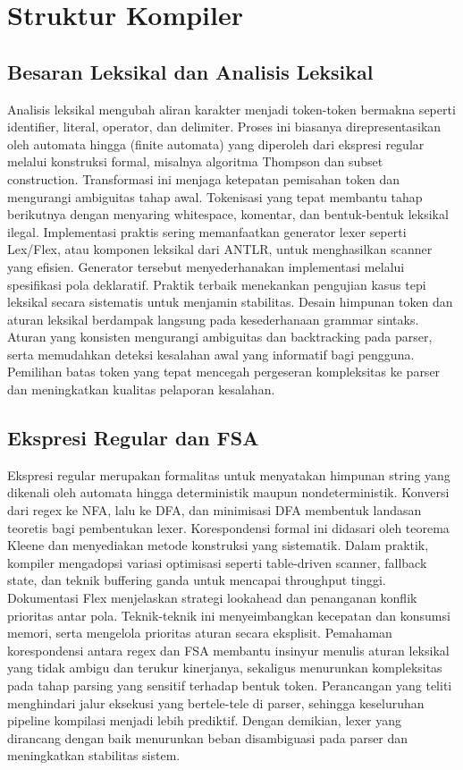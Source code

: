 \documentclass[../main.tex]{subfiles}
\begin{document}
\chapter{Struktur Kompiler}
\label{ch:struktur-kompiler}

\section{Besaran Leksikal dan Analisis Leksikal}
Analisis leksikal mengubah aliran karakter menjadi token-token bermakna seperti identifier, literal, operator, dan delimiter. Proses ini biasanya direpresentasikan oleh automata hingga (finite automata) yang diperoleh dari ekspresi regular melalui konstruksi formal, misalnya algoritma Thompson dan subset construction.\cite{aho-dragon-book-2006, hopcroft-ullman} Transformasi ini menjaga ketepatan pemisahan token dan mengurangi ambiguitas tahap awal.
Tokenisasi yang tepat membantu tahap berikutnya dengan menyaring whitespace, komentar, dan bentuk-bentuk leksikal ilegal. Implementasi praktis sering memanfaatkan generator lexer seperti Lex/Flex, atau komponen leksikal dari ANTLR, untuk menghasilkan scanner yang efisien.\cite{flex-manual, antlr-book} Generator tersebut menyederhanakan implementasi melalui spesifikasi pola deklaratif. Praktik terbaik menekankan pengujian kasus tepi leksikal secara sistematis untuk menjamin stabilitas.
Desain himpunan token dan aturan leksikal berdampak langsung pada kesederhanaan grammar sintaks. Aturan yang konsisten mengurangi ambiguitas dan backtracking pada parser, serta memudahkan deteksi kesalahan awal yang informatif bagi pengguna. Pemilihan batas token yang tepat mencegah pergeseran kompleksitas ke parser dan meningkatkan kualitas pelaporan kesalahan.

\section{Ekspresi Regular dan FSA}
Ekspresi regular merupakan formalitas untuk menyatakan himpunan string yang dikenali oleh automata hingga deterministik maupun nondeterministik. Konversi dari regex ke NFA, lalu ke DFA, dan minimisasi DFA membentuk landasan teoretis bagi pembentukan lexer.\cite{sipser} Korespondensi formal ini didasari oleh teorema Kleene dan menyediakan metode konstruksi yang sistematik.
Dalam praktik, kompiler mengadopsi variasi optimisasi seperti table-driven scanner, fallback state, dan teknik buffering ganda untuk mencapai throughput tinggi. Dokumentasi Flex menjelaskan strategi lookahead dan penanganan konflik prioritas antar pola.\cite{flex-manual} Teknik-teknik ini menyeimbangkan kecepatan dan konsumsi memori, serta mengelola prioritas aturan secara eksplisit.
Pemahaman korespondensi antara regex dan FSA membantu insinyur menulis aturan leksikal yang tidak ambigu dan terukur kinerjanya, sekaligus menurunkan kompleksitas pada tahap parsing yang sensitif terhadap bentuk token. Perancangan yang teliti menghindari jalur eksekusi yang bertele-tele di parser, sehingga keseluruhan pipeline kompilasi menjadi lebih prediktif. Dengan demikian, lexer yang dirancang dengan baik menurunkan beban disambiguasi pada parser dan meningkatkan stabilitas sistem.

\IfSubfilesClassLoaded{%
\printbibliography
}{}
\end{document}
